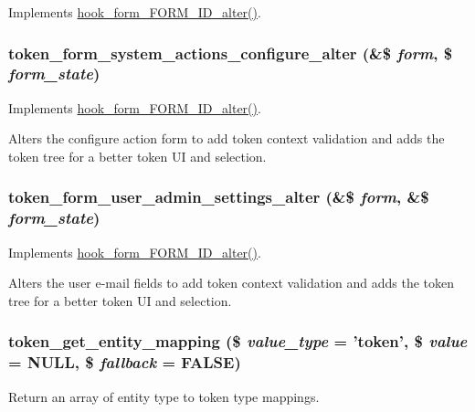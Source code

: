 \label{token_8module_aafd876aa871c14cf1c4ed7cc130a7fef}
Implements \hyperlink{group__hooks_ga8d4a4089551493d55911bd5c4f218264}{hook\_\-form\_\-FORM\_\-ID\_\-alter()}. \hypertarget{token_8module_a9e90ed1423fef7afcb0f3283cf9fc7c8}{
\subsubsection[{token\_\-form\_\-system\_\-actions\_\-configure\_\-alter}]{\setlength{\rightskip}{0pt plus 5cm}token\_\-form\_\-system\_\-actions\_\-configure\_\-alter (\&\$ {\em form}, \/  \$ {\em form\_\-state})}}
\label{token_8module_a9e90ed1423fef7afcb0f3283cf9fc7c8}
Implements \hyperlink{group__hooks_ga8d4a4089551493d55911bd5c4f218264}{hook\_\-form\_\-FORM\_\-ID\_\-alter()}.

Alters the configure action form to add token context validation and adds the token tree for a better token UI and selection. \hypertarget{token_8module_a1631840450884761bfdf41635e55700d}{
\subsubsection[{token\_\-form\_\-user\_\-admin\_\-settings\_\-alter}]{\setlength{\rightskip}{0pt plus 5cm}token\_\-form\_\-user\_\-admin\_\-settings\_\-alter (\&\$ {\em form}, \/  \&\$ {\em form\_\-state})}}
\label{token_8module_a1631840450884761bfdf41635e55700d}
Implements \hyperlink{group__hooks_ga8d4a4089551493d55911bd5c4f218264}{hook\_\-form\_\-FORM\_\-ID\_\-alter()}.

Alters the user e-\/mail fields to add token context validation and adds the token tree for a better token UI and selection. \hypertarget{token_8module_a44ada8bf0431313606adce0148b29b82}{
\subsubsection[{token\_\-get\_\-entity\_\-mapping}]{\setlength{\rightskip}{0pt plus 5cm}token\_\-get\_\-entity\_\-mapping (\$ {\em value\_\-type} = {\ttfamily 'token'}, \/  \$ {\em value} = {\ttfamily NULL}, \/  \$ {\em fallback} = {\ttfamily FALSE})}}
\label{token_8module_a44ada8bf0431313606adce0148b29b82}
Return an array of entity type to token type mappings.

